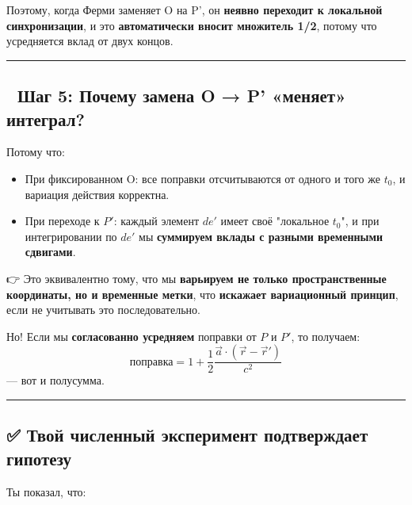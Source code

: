 \documentclass[11pt]{article}
\providecommand{\tightlist}{%
      \setlength{\itemsep}{0pt}\setlength{\parskip}{0pt}}
\begin{document}
Поэтому, когда Ферми заменяет O на P', он \textbf{неявно переходит к
локальной синхронизации}, и это \textbf{автоматически вносит множитель
1/2}, потому что усредняется вклад от двух концов.

\begin{center}\rule{0.5\linewidth}{\linethickness}\end{center}

\subsection{📌 Шаг 5: Почему замена O → P' «меняет»
интеграл?}\label{ux448ux430ux433-5-ux43fux43eux447ux435ux43cux443-ux437ux430ux43cux435ux43dux430-o-p-ux43cux435ux43dux44fux435ux442-ux438ux43dux442ux435ux433ux440ux430ux43b}

Потому что:

\begin{itemize}
\tightlist
\item
  При фиксированном O: все поправки отсчитываются от одного и того же
  \(t_0\), и вариация действия корректна.
\item
  При переходе к \(P'\): каждый элемент \(de'\) имеет своё "локальное
  \(t_0\)", и при интегрировании по \(de'\) мы \textbf{суммируем вклады
  с разными временными сдвигами}.
\end{itemize}

👉 Это эквивалентно тому, что мы \textbf{варьируем не только
пространственные координаты, но и временные метки}, что \textbf{искажает
вариационный принцип}, если не учитывать это последовательно.

Но! Если мы \textbf{согласованно усредняем} поправки от \(P\) и \(P'\),
то получаем: \[
\text{поправка} = 1 + \frac{1}{2} \frac{\vec{a} \cdot (\vec{r} - \vec{r}')}{c^2}
\] --- вот и полусумма.

\begin{center}\rule{0.5\linewidth}{\linethickness}\end{center}

\subsection{✅ Твой численный эксперимент подтверждает
гипотезу}\label{ux442ux432ux43eux439-ux447ux438ux441ux43bux435ux43dux43dux44bux439-ux44dux43aux441ux43fux435ux440ux438ux43cux435ux43dux442-ux43fux43eux434ux442ux432ux435ux440ux436ux434ux430ux435ux442-ux433ux438ux43fux43eux442ux435ux437ux443}

Ты показал, что:
\end{document}
